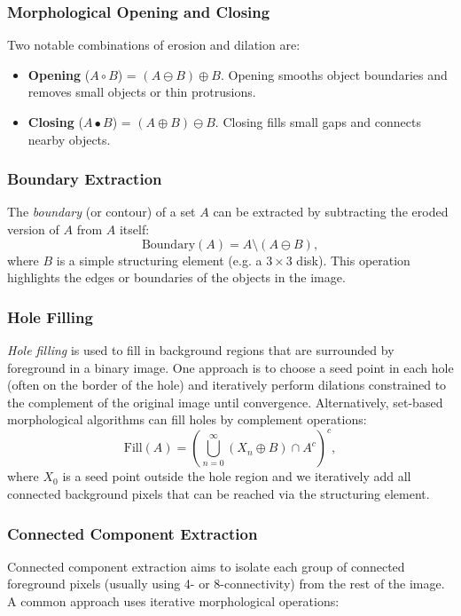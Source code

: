 \documentclass[a4paper,12pt]{article}
\begin{document}
\subsubsection{Morphological Opening and Closing}

Two notable combinations of erosion and dilation are:
\begin{itemize}
    \item \textbf{Opening} (\(A \circ B\)) = \((A \ominus B) \oplus B\). Opening smooths object boundaries and removes small objects or thin protrusions.
    \item \textbf{Closing} (\(A \bullet B\)) = \((A \oplus B) \ominus B\). Closing fills small gaps and connects nearby objects.
\end{itemize}

\subsubsection{Boundary Extraction}

The \emph{boundary} (or contour) of a set \(A\) can be extracted by subtracting the eroded version of \(A\) from \(A\) itself:
\[
  \text{Boundary}(A) = A \setminus (A \ominus B),
\]
where \(B\) is a simple structuring element (e.g. a \(3 \times 3\) disk). This operation highlights the edges or boundaries of the objects in the image.

\subsubsection{Hole Filling}

\emph{Hole filling} is used to fill in background regions that are surrounded by foreground in a binary image. One approach is to choose a seed point in each hole (often on the border of the hole) and iteratively perform dilations constrained to the complement of the original image until convergence. Alternatively, set-based morphological algorithms can fill holes by complement operations:
\[
  \text{Fill}(A) = \left( \bigcup_{n=0}^{\infty} (X_n \oplus B) \cap A^c \right)^c,
\]
where \(X_0\) is a seed point outside the hole region and we iteratively add all connected background pixels that can be reached via the structuring element.

\subsubsection{Connected Component Extraction}

Connected component extraction aims to isolate each group of connected foreground pixels (usually using 4- or 8-connectivity) from the rest of the image. A common approach uses iterative morphological operations:
\end{document}
